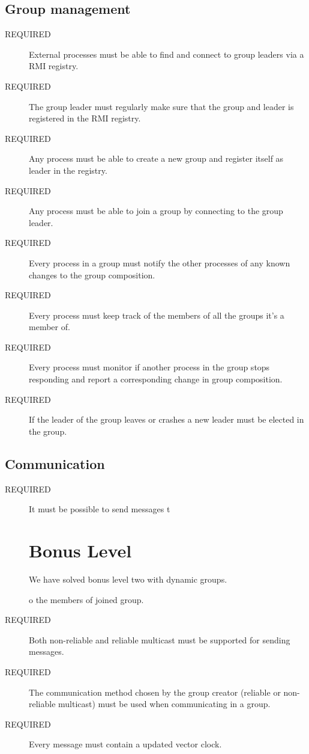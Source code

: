 \documentclass[english]{article}
\begin{document}
\subsection{Group management}
\begin{description}
\item[REQUIRED] External processes must be able to find and connect to group leaders via a RMI registry.

\item[REQUIRED] The group leader must regularly make sure that the group and leader is registered in the RMI registry.

\item[REQUIRED] Any process must be able to create a new group and register itself as leader in the registry.

\item[REQUIRED] Any process must be able to join a group by connecting to the group leader.

\item[REQUIRED] Every process in a group must notify the other processes of any known changes to the group composition.

\item[REQUIRED] Every process must keep track of the members of all the groups it's a member of.

\item[REQUIRED] Every process must monitor if another process in the group stops responding and report a corresponding change in group composition.

\item[REQUIRED] If the leader of the group leaves or crashes a new leader must be elected in the group.
\end{description}


\subsection{Communication}
\begin{description}
\item[REQUIRED] It must be possible to send messages t
\section{Bonus Level}
We have solved bonus level two with dynamic groups. 

o the members of joined group.

\item[REQUIRED] Both non-reliable and reliable multicast must be supported for sending messages.

\item[REQUIRED] The communication method chosen by the group creator (reliable or non-reliable multicast) must be used when communicating in a group.

\item[REQUIRED] Every message must contain a updated vector clock.
\end{description}
\end{document}
